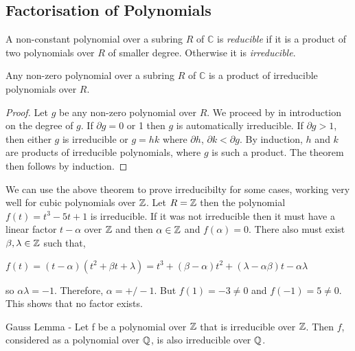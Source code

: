 \subsection{Factorisation of Polynomials}
\begin{definition}
     A non-constant polynomial over a subring $R$ of $\mathbb{C}$ is \textit{reducible} if it is a product of two polynomials over $R$ of smaller degree. Otherwise it is \textit{irreducible}.
\end{definition}

\begin{theorem}
    Any non-zero polynomial over a subring $R$ of $\mathbb{C}$ is a product of irreducible polynomials over $R$.
\end{theorem}

\begin{proof}
    Let $g$ be any non-zero polynomial over $R$. We proceed by in introduction on the degree of $g$. If $\partial g = 0$ or 1 then $g$ is automatically irreducible. If $\partial g > 1$, then either $g$ is irreducible or $g = hk$ where $\partial h$, $\partial k < \partial g$. By induction, $h$ and $k$ are products of irreducible polynomials, where $g$ is such a product. The theorem then follows by induction.
\end{proof}

\begin{example}
    We can use the above theorem to prove irreducibilty for some cases, working very well for cubic polynomials over $\mathbb Z$. Let $R = \mathbb Z$ then the polynomial $f(t) = t^3 -5 t + 1$ is irreducible. If it was not irreducible then it must have a linear factor $t - \alpha$ over $\mathbb Z$ and then $\alpha \in \mathbb Z$ and $f(\alpha) = 0$. There also must exist $\beta, \lambda \in \mathbb Z$ such that,

    $f(t) = (t-\alpha)(t^2 + \beta t + \lambda) = t^3 + (\beta - \alpha)t^2 + (\lambda - \alpha \beta)t - \alpha \lambda$

    so $\alpha \lambda = -1$. Therefore, $\alpha = +/- 1$. But $f(1) = -3 \neq 0$ and $f(-1) = 5 \neq 0$. This shows that no factor exists.
\end{example}

\begin{theorem}
    Gauss Lemma - Let f be a polynomial over $\mathbb Z$ that is irreducible over $\mathbb Z$. Then $f$, considered as a polynomial over $\mathbb Q$, is also irreducible over $\mathbb Q$.
\end{theorem}

